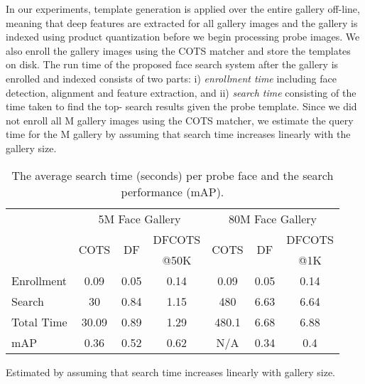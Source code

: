\documentclass[10pt,journal,compsoc]{IEEEtran}
\begin{document}
In our experiments, template generation is applied over the entire gallery off-line, meaning that deep features are extracted for all gallery images and the gallery is indexed using product quantization before we begin processing probe images. We also enroll the gallery images using the COTS matcher and store the templates on disk. The run time of the proposed face search system after the gallery is enrolled and indexed consists of two parts: i) \emph{enrollment time} including face detection, alignment and feature extraction, and ii) \emph{search time} consisting of the time taken to find the top- search results given the probe template. Since we did not enroll all M gallery images using the COTS matcher, we estimate the query time for the M gallery by assuming that search time increases linearly with the gallery size.
\begin{table}[]
\scriptsize
\centering
\begin{threeparttable}[b]
\caption{The average search time (seconds) per probe face and the search performance (mAP).}\label{tab:running_time}
\begin{tabular}{l|ccc|ccc}
\toprule
               & \multicolumn{3}{c|}{5M Face Gallery} & \multicolumn{3}{c}{80M Face Gallery} \\ \cmidrule{2-7}
               & \multirow{2}{*}{COTS}   & \multirow{2}{*}{DF}   & {\scriptsize DFCOTS} & \multirow{2}{*}{COTS}   & \multirow{2}{*}{DF}    & {\scriptsize DFCOTS} \\
               & & & {\scriptsize @50K} & & & {\scriptsize @1K} \\ \midrule
Enrollment     & 0.09   & 0.05 & 0.14                & 0.09   & 0.05  & 0.14                \\
Search      & 30     & 0.84 & 1.15                & 480    & 6.63  & 6.64                \\
Total Time     & 30.09  & 0.89 & 1.29                & 480.1  & 6.68  & 6.88                \\ \cmidrule{1-1}
mAP            & 0.36   & 0.52 & 0.62                & N/A    & 0.34  & 0.4                 \\ \bottomrule
\end{tabular}
\begin{tablenotes}
    \item[]Estimated by assuming that search time increases linearly with gallery size.
\end{tablenotes}
\end{threeparttable}
\end{table}
\end{document}
